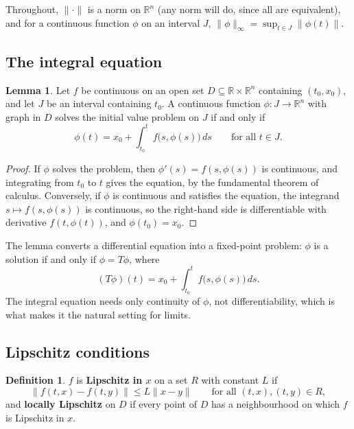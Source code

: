 \documentclass[11pt,a4paper]{article}
\numberwithin{equation}{section}
\theoremstyle{definition}
\newtheorem{defn}[thm]{Definition}
\newtheorem{lem}[thm]{Lemma}
\begin{document}
Throughout, $\|\cdot\|$ is a norm on $\mathbb R^n$ (any norm will do, since all are equivalent), and for a continuous function $\phi$ on an interval $J$, $\|\phi\|_\infty = \sup_{t \in J}\|\phi(t)\|$.

\subsection{The integral equation}
\label{ssec:integral}

\begin{lem}
\label{lem:integral}
Let $f$ be continuous on an open set $D \subseteq \mathbb R \times \mathbb R^n$ containing $(t_0, x_0)$, and let $J$ be an interval containing $t_0$. A continuous function $\phi\colon J \to \mathbb R^n$
with graph in $D$ solves the initial value problem on $J$ if and only if
\[
\phi(t) = x_0 + \int_{t_0}^tf\bigl(s, \phi(s)\bigr)\,ds \qquad\text{for all } t \in J .
\]
\end{lem}

\begin{proof}
If $\phi$ solves the problem, then $\phi'(s) = f(s, \phi(s))$ is continuous, and integrating from $t_0$ to $t$ gives the equation, by the fundamental theorem of calculus. Conversely,
if $\phi$ is continuous and satisfies the equation, the integrand $s \mapsto f(s, \phi(s))$ is continuous, so the right-hand side is differentiable with derivative $f(t, \phi(t))$, and
$\phi(t_0) = x_0$.
\end{proof}

The lemma converts a differential equation into a fixed-point problem: $\phi$ is a solution if and only if $\phi = T\phi$, where
\[
(T\phi)(t) = x_0 + \int_{t_0}^tf\bigl(s, \phi(s)\bigr)\,ds .
\]
The integral equation needs only continuity of $\phi$, not differentiability, which is what makes it the natural setting for limits.

\subsection{Lipschitz conditions}
\label{ssec:lipschitz}

\begin{defn}
$f$ is \textbf{Lipschitz in $x$} on a set $R$ with constant $L$ if
\[
\|f(t, x) - f(t, y)\| \leq L\|x - y\| \qquad\text{for all } (t, x), (t, y) \in R ,
\]
and \textbf{locally Lipschitz} on $D$ if every point of $D$ has a neighbourhood on which $f$ is Lipschitz in $x$.
\end{defn}
\end{document}
